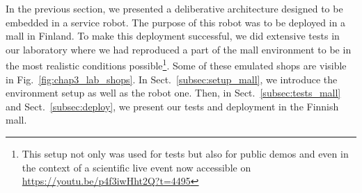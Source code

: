 \documentclass[a4paper,11pt,twoside]{StyleThese}
\begin{document}
In the previous section, we presented a deliberative architecture designed to be embedded in a service robot. The purpose of this robot was to be deployed in a mall in Finland. 
To make this deployment successful, we did extensive tests in our laboratory where we had reproduced a part of the mall environment to be in the most realistic conditions possible\footnote{This setup not only was used for tests but also for public demos and even in the context of a scientific live event now accessible on \url{https://youtu.be/p4f3iwHht2Q?t=4495}}. Some of these emulated shops are visible in Fig.~\ref{fig:chap3_lab_shops}. 
In Sect.~\ref{subsec:setup_mall}, we introduce the environment setup as well as the robot one. Then, in Sect.~\ref{subsec:tests_mall} and Sect.~\ref{subsec:deploy}, we present our tests and deployment in the Finnish mall. 
\end{document}

